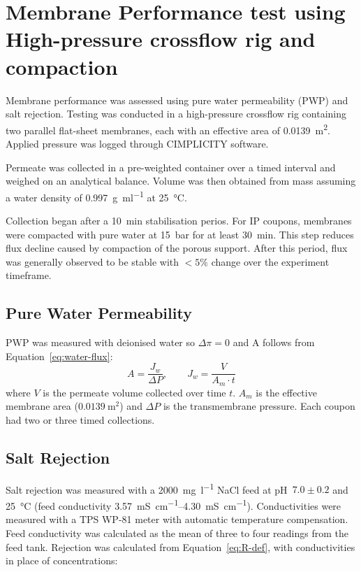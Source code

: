 \section{Membrane Performance test using High-pressure crossflow rig and compaction}
\label{sec:rig performance}
Membrane performance was assessed using pure water permeability (PWP) and salt rejection. Testing was conducted in a high-pressure crossflow rig containing two parallel flat-sheet membranes, each with an effective area of \qty{0.0139}{\square\metre}. Applied pressure was logged through CIMPLICITY software. 

Permeate was collected in a pre-weighted container over a timed interval and weighed on an analytical balance. Volume was then obtained from mass assuming a water density of \qty{0.997}{\gram\per\milli\litre} at \qty{25}{\degreeCelsius}. 

Collection began after a \qty{10}{\minute} stabilisation perios. For IP coupons, membranes were compacted with pure water at \qty{15}{bar} for at least \qty{30}{\minute}. This step reduces flux decline caused by compaction of the porous support. After this period, flux was generally observed to be stable with $<5\%$ change over the experiment timeframe. 

\subsection{Pure Water Permeability}
PWP was measured with deionised water so $\Delta \pi = 0$ and A follows from Equation~\ref{eq:water-flux}:
\begin{equation}
  A = \frac{J_w}{\Delta P}, \qquad J_w = \frac{V}{A_m\cdot t}
  \label{eq:pwp-methods}
\end{equation}
where $V$ is the permeate volume collected over time $t$.  $A_m$ is the effective membrane area ($\qty{0.0139}{\square\metre}$) and $\Delta P$ is the transmembrane pressure. Each coupon had two or three timed collections. 


\subsection{Salt Rejection}
Salt rejection was measured with a \qty{2000}{\milli\gram\per\litre} NaCl feed at pH~$7.0 \pm 0.2$ and \qty{25}{\degreeCelsius} (feed conductivity \qtyrange{3.57}{4.30}{\milli\siemens\per\centi\metre}). Conductivities were measured with a TPS WP-81 meter with automatic temperature compensation. Feed conductivity was calculated as the mean of three to four readings from the feed tank. Rejection was calculated from Equation~\ref{eq:R-def}, with conductivities in place of concentrations:

